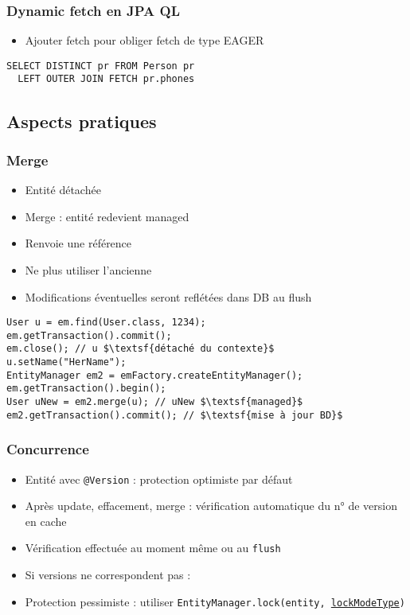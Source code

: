 \documentclass[english, french]{beamer}
\begin{document}
\begin{frame}[fragile]
	\frametitle{Dynamic fetch en JPA QL}
	\begin{itemize}
		\item Ajouter fetch pour obliger fetch de type EAGER
	\end{itemize}
	\begin{lstlisting}
SELECT DISTINCT pr FROM Person pr 
  LEFT OUTER JOIN FETCH pr.phones
	\end{lstlisting}
\end{frame}

\subsection{Aspects pratiques}
\begin{frame}[fragile]
	\frametitle{Merge}
	\begin{itemize}
		\item Entité détachée
		\item Merge : entité redevient managed
		\item Renvoie une référence
		\item Ne plus utiliser l’ancienne
		\item Modifications éventuelles seront reflétées dans DB au flush
	\end{itemize}
	\begin{lstlisting}[escapechar=$]
User u = em.find(User.class, 1234);
em.getTransaction().commit();
em.close(); // u $\textsf{détaché du contexte}$
u.setName("HerName");
EntityManager em2 = emFactory.createEntityManager();
em.getTransaction().begin();
User uNew = em2.merge(u); // uNew $\textsf{managed}$
em2.getTransaction().commit(); // $\textsf{mise à jour BD}$
	\end{lstlisting}
\end{frame}

\begin{frame}
	\frametitle{Concurrence}
	\begin{itemize}
		\item Entité avec \texttt{@Version} : protection optimiste par défaut
		\item Après update, effacement, merge : vérification automatique du n° de version en cache%
		\item Vérification effectuée au moment même ou au \texttt{flush}
		\item Si versions ne correspondent pas : 
		\item Protection pessimiste : utiliser \texttt{EntityManager.lock(entity, \href{https://docs.oracle.com/javaee/7/api/javax/persistence/LockModeType.html}{lockModeType})}
	\end{itemize}
\end{frame}
\end{document}
